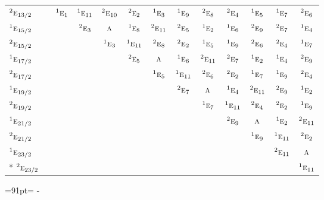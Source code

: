 \documentclass[10pt,a4paper]{article}
\newcommand{\needspace}[1]{\par\penalty-100\begingroup\dimen0=#1\relax\dimen2=\pagegoal
  \advance\dimen2-\pagetotal\ifdim\dimen0>\dimen2\relax\ifdim\dimen2>0pt\vfil\break\fi\fi
  \endgroup}
\numberwithin{equation}{section}
\newcommand{\irr}[1]{\text{\normalfont\scshape #1}}
\newcommand{\conjpair}[1]{{}^{#1}}
\begin{document}
{\begin{longtable}{@{}lcccccccccccc@{}}
$\conjpair{2}\irr{e}_{13/2}$ &  & $\conjpair{1}\irr{e}_{1}$ & $\conjpair{1}\irr{e}_{11}$ & $\conjpair{2}\irr{e}_{10}$ & $\conjpair{2}\irr{e}_{2}$ & $\conjpair{1}\irr{e}_{3}$ & $\conjpair{1}\irr{e}_{9}$ & $\conjpair{2}\irr{e}_{8}$ & $\conjpair{2}\irr{e}_{4}$ & $\conjpair{1}\irr{e}_{5}$ & $\conjpair{1}\irr{e}_{7}$ & $\conjpair{2}\irr{e}_{6}$\\
$\conjpair{1}\irr{e}_{15/2}$ &  &  & $\conjpair{2}\irr{e}_{3}$ & $\irr{a}$ & $\conjpair{1}\irr{e}_{8}$ & $\conjpair{2}\irr{e}_{11}$ & $\conjpair{2}\irr{e}_{5}$ & $\conjpair{1}\irr{e}_{2}$ & $\conjpair{1}\irr{e}_{6}$ & $\conjpair{2}\irr{e}_{9}$ & $\conjpair{2}\irr{e}_{7}$ & $\conjpair{1}\irr{e}_{4}$\\
$\conjpair{2}\irr{e}_{15/2}$ &  &  &  & $\conjpair{1}\irr{e}_{3}$ & $\conjpair{1}\irr{e}_{11}$ & $\conjpair{2}\irr{e}_{8}$ & $\conjpair{2}\irr{e}_{2}$ & $\conjpair{1}\irr{e}_{5}$ & $\conjpair{1}\irr{e}_{9}$ & $\conjpair{2}\irr{e}_{6}$ & $\conjpair{2}\irr{e}_{4}$ & $\conjpair{1}\irr{e}_{7}$\\
$\conjpair{1}\irr{e}_{17/2}$ &  &  &  &  & $\conjpair{2}\irr{e}_{5}$ & $\irr{a}$ & $\conjpair{1}\irr{e}_{6}$ & $\conjpair{2}\irr{e}_{11}$ & $\conjpair{2}\irr{e}_{7}$ & $\conjpair{1}\irr{e}_{2}$ & $\conjpair{1}\irr{e}_{4}$ & $\conjpair{2}\irr{e}_{9}$\\
$\conjpair{2}\irr{e}_{17/2}$ &  &  &  &  &  & $\conjpair{1}\irr{e}_{5}$ & $\conjpair{1}\irr{e}_{11}$ & $\conjpair{2}\irr{e}_{6}$ & $\conjpair{2}\irr{e}_{2}$ & $\conjpair{1}\irr{e}_{7}$ & $\conjpair{1}\irr{e}_{9}$ & $\conjpair{2}\irr{e}_{4}$\\
$\conjpair{1}\irr{e}_{19/2}$ &  &  &  &  &  &  & $\conjpair{2}\irr{e}_{7}$ & $\irr{a}$ & $\conjpair{1}\irr{e}_{4}$ & $\conjpair{2}\irr{e}_{11}$ & $\conjpair{2}\irr{e}_{9}$ & $\conjpair{1}\irr{e}_{2}$\\
$\conjpair{2}\irr{e}_{19/2}$ &  &  &  &  &  &  &  & $\conjpair{1}\irr{e}_{7}$ & $\conjpair{1}\irr{e}_{11}$ & $\conjpair{2}\irr{e}_{4}$ & $\conjpair{2}\irr{e}_{2}$ & $\conjpair{1}\irr{e}_{9}$\\
$\conjpair{1}\irr{e}_{21/2}$ &  &  &  &  &  &  &  &  & $\conjpair{2}\irr{e}_{9}$ & $\irr{a}$ & $\conjpair{1}\irr{e}_{2}$ & $\conjpair{2}\irr{e}_{11}$\\
$\conjpair{2}\irr{e}_{21/2}$ &  &  &  &  &  &  &  &  &  & $\conjpair{1}\irr{e}_{9}$ & $\conjpair{1}\irr{e}_{11}$ & $\conjpair{2}\irr{e}_{2}$\\
$\conjpair{1}\irr{e}_{23/2}$ &  &  &  &  &  &  &  &  &  &  & $\conjpair{2}\irr{e}_{11}$ & $\irr{a}$\\*
$\conjpair{2}\irr{e}_{23/2}$ &  &  &  &  &  &  &  &  &  &  &  & $\conjpair{1}\irr{e}_{11}$\\
\bottomrule\end{longtable}}
\needspace{91pt}
\end{document}
